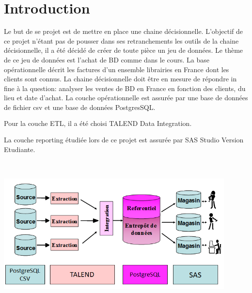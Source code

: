 \chapter{Introduction}

Le but de se projet est de mettre en place une chaine décisionnelle. L'objectif de ce projet n'étant pas de pousser dans ses retranchements les outils de la chaine décisionnelle, il a été décidé de créer de toute pièce un jeu de données. Le thème de ce jeu de données est l'achat de BD comme dans le cours. 
La base opérationnelle décrit les factures d'un ensemble librairies en France dont les clients sont connus.
La chaine décisionnelle doit être en mesure de répondre in fine à la question: analyser les ventes de BD en France en fonction des clients, du lieu et date d'achat.
La couche opérationnelle est assurée par une base de données de fichier csv et une base de données PostgresSQL. 

Pour la couche ETL, il a été choisi TALEND Data Integration. 

La couche reporting étudiée lors de ce projet est assurée par SAS Studio Version Etudiante.

\includegraphics[clip=true, width=120mm, height=80mm]{images/chaine.png} 

\clearpage
